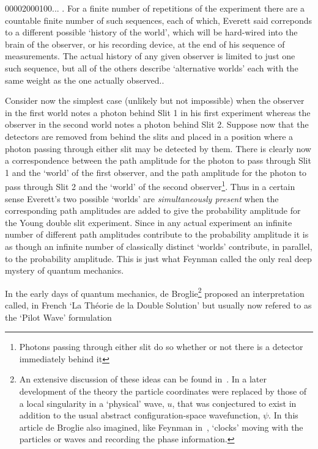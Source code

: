 \documentclass [12pt]{article}
\begin{document}
{    00002000100... . For a finite number of repetitions of the experiment there are a
   countable finite number of such sequences, each of which, Everett said correponds to
   a different possible `history of the world', which will be hard-wired into the brain 
  of the observer, or his recording device, at the end of his sequence of measurements.
    The actual history of any given observer is limited to just one such sequence,
    but all of the others describe `alternative worlds' each with the same weight
    as the one actually observed..
   \par Consider now the simplest case (unlikely but not impossible) 
    when the observer in the first world notes a photon behind Slit 1 in his first
   experiment whereas the observer in the second world notes a photon behind Slit 2.
   Suppose now that the detectors are removed from behind the slits and placed in a
    position where a photon passing through either slit may be detected by them.
     There is clearly now a correspondence between the path amplitude for the photon
   to pass through Slit 1 and the `world' of the first observer, and the path
   amplitude for the photon to pass through Slit 2 and the `world' of the second
   observer\footnote{Photons passing through either slit do so whether or not there is 
   a detector immediately behind it}. Thus in a certain sense Everett's two possible
  `worlds' are {\it simultaneously present} when the corresponding path amplitudes are
   added to give the probability amplitude for the Young double slit experiment.
   Since in any actual experiment an infinite number of different path amplitudes
   contribute to the probability amplitude it is as though an infinite number
   of classically distinct `worlds' contribute, in parallel, to the probability
   amplitude. This is just what Feynman called the only real deep mystery of
   quantum mechanics.
   \par In the early days of quantum mechanics, de Broglie\footnote{An extensive discussion
   of these ideas can be found in~\cite{DeBroglie1}. In a later development
   of the theory the particle coordinates were replaced by those of a local singularity
    in a `physical' wave, $u$, that was conjectured to exist in addition to the usual
   abstract configuration-space wavefunction, $\psi$. In this article de Broglie also
  imagined, like Feynman in~\cite{Feyn1}, `clocks' moving with the particles or waves
  and recording the phase information.} proposed an interpretation called, in French `La Th\'{e}orie de la
   Double Solution' but usually now refered to as the `Pilot Wave' formulation
}
\end{document}
